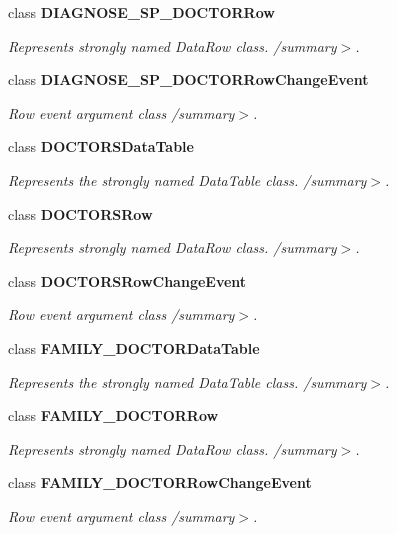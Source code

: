 \begin{CompactItemize}
class {\bf DIAGNOSE\_\-SP\_\-DOCTORRow}
\begin{CompactList}\small\item\em Represents strongly named DataRow class. /summary$>$. \item\end{CompactList}\item 
class {\bf DIAGNOSE\_\-SP\_\-DOCTORRowChangeEvent}
\begin{CompactList}\small\item\em Row event argument class /summary$>$. \item\end{CompactList}\item 
class {\bf DOCTORSDataTable}
\begin{CompactList}\small\item\em Represents the strongly named DataTable class. /summary$>$. \item\end{CompactList}\item 
class {\bf DOCTORSRow}
\begin{CompactList}\small\item\em Represents strongly named DataRow class. /summary$>$. \item\end{CompactList}\item 
class {\bf DOCTORSRowChangeEvent}
\begin{CompactList}\small\item\em Row event argument class /summary$>$. \item\end{CompactList}\item 
class {\bf FAMILY\_\-DOCTORDataTable}
\begin{CompactList}\small\item\em Represents the strongly named DataTable class. /summary$>$. \item\end{CompactList}\item 
class {\bf FAMILY\_\-DOCTORRow}
\begin{CompactList}\small\item\em Represents strongly named DataRow class. /summary$>$. \item\end{CompactList}\item 
class {\bf FAMILY\_\-DOCTORRowChangeEvent}
\begin{CompactList}\small\item\em Row event argument class /summary$>$. \item\end{CompactList}\item 

\end{CompactItemize}
